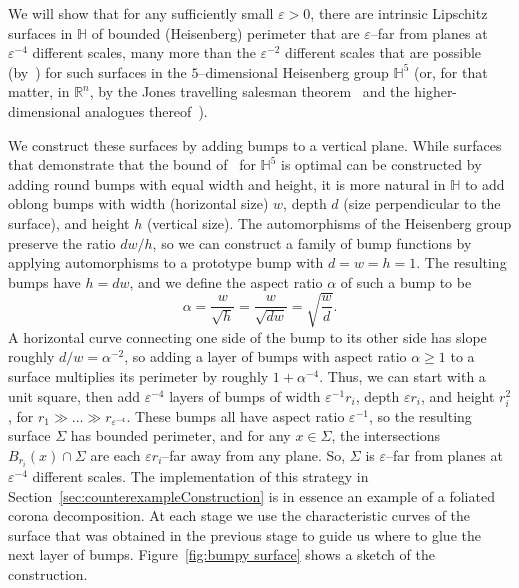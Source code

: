 \documentclass[11pt,reqno]{amsart}
\renewcommand{\H}{\mathbb{H}}
\newcommand{\R}{\mathbb{R}}
\renewcommand{\epsilon}{\varepsilon}
\newcommand{\0}{\mathbf{0}}
\renewcommand{\1}{\mathbf 1}
\renewcommand{\ge}{\geqslant}
\theoremstyle{remark}
\begin{document}
We will show that for any sufficiently small $\epsilon>0$, there are intrinsic Lipschitz surfaces in $\H$ of bounded (Heisenberg) perimeter that are $\epsilon$--far from planes at $\epsilon^{-4}$ different scales, many more than the $\epsilon^{-2}$ different scales that are possible (by~\cite{NY18}) for such surfaces in the $5$--dimensional Heisenberg group $\H^5$ (or, for that matter, in $\R^n$, by the Jones travelling salesman theorem~\cite{Jon90} and the higher-dimensional analogues thereof~\cite{DavidSemmesSingular}).





We construct these surfaces by adding bumps to a vertical plane.  While  surfaces that demonstrate that the bound of~\cite{NY18} for $\H^5$ is optimal can be constructed by adding round bumps with equal width and height, it is more natural in $\H$ to add oblong bumps with width (horizontal size) $w$, depth $d$ (size perpendicular to the surface), and height $h$ (vertical size).  The automorphisms of the Heisenberg group preserve the ratio $dw/h$, so we can construct a family of bump functions by applying automorphisms to a prototype bump with $d=w=h=1$.  The resulting bumps have $h=dw$, and we define the aspect ratio $\alpha$ of such a bump to be
$$\alpha=\frac{w}{\sqrt{h}}=\frac{w}{\sqrt{d w}}=\sqrt{\frac{w}{d}}.$$
A horizontal curve connecting one side of the bump to its other side has slope roughly $d/w=\alpha^{-2}$, so adding a layer of bumps with aspect ratio $\alpha\ge 1$ to a surface multiplies its perimeter by roughly $1+\alpha^{-4}$. Thus, we can start with a unit square, then add $\epsilon^{-4}$ layers of bumps of width $\epsilon^{-1} r_i$, depth $\epsilon r_i$, and height $r_i^2$, for $r_1 \gg \dots \gg r_{\epsilon^{-4}}$.  These bumps all have aspect ratio $\epsilon^{-1}$, so the resulting surface $\Sigma$ has bounded perimeter, and for any $x\in \Sigma$, the intersections $B_{r_i}(x)\cap \Sigma$ are each $\epsilon r_i$--far away from any plane.  So, $\Sigma$ is $\epsilon$--far from planes at $\epsilon^{-4}$ different scales. The implementation of this strategy in Section~\ref{sec:counterexampleConstruction} is in essence an example of a foliated corona decomposition. At each stage we use the characteristic curves of the surface that was obtained in the previous stage to guide us where to glue the next layer of bumps.   Figure~\ref{fig:bumpy surface} shows a sketch of the construction.
\end{document}
